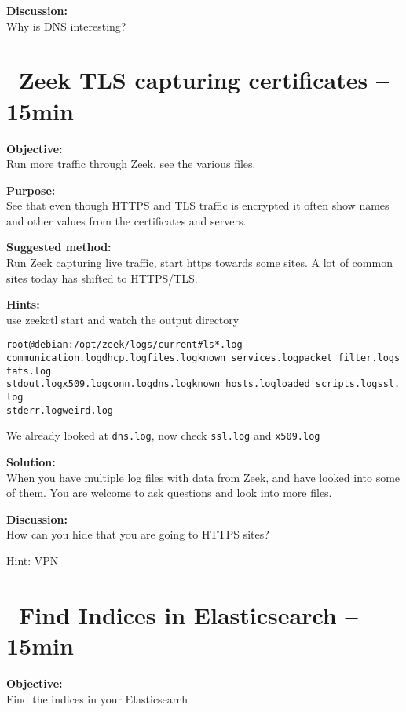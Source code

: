 \documentclass[a4paper,11pt,notitlepage]{report}
\begin{document}
{\bf Discussion:}\\
Why is DNS interesting?


\chapter{\faExclamationTriangle\ Zeek TLS capturing certificates -- 15min}
\label{ex:zeektlsbasic}


{\bf Objective:} \\
Run more traffic through Zeek, see the various files.


{\bf Purpose:}\\
See that even though HTTPS and TLS traffic is encrypted it often show names and other values from the certificates and servers.


{\bf Suggested method:}\\
Run Zeek capturing live traffic, start https towards some sites. A lot of common sites today has shifted to HTTPS/TLS.


{\bf Hints:}\\
use zeekctl start and watch the output directory

\begin{alltt}\small
root@debian:/opt/zeek/logs/current# ls *.log
communication.log  dhcp.log files.log known_services.log packet_filter.log  stats.log
stdout.log x509.log conn.log dns.log known_hosts.log loaded_scripts.log  ssl.log
stderr.log weird.log
\end{alltt}

We already looked at \verb+dns.log+, now check \verb+ssl.log+ and \verb+x509.log+

{\bf Solution:}\\
When you have multiple log files with data from Zeek, and have looked into some of them. You are welcome to ask questions and look into more files.


{\bf Discussion:}\\
How can you hide that you are going to HTTPS sites?

Hint: VPN




\chapter{\faExclamationTriangle\ Find Indices in Elasticsearch -- 15min}
\label{ex:es-find-indices}

{\bf Objective:}\\
Find the indices in your Elasticsearch
\end{document}
